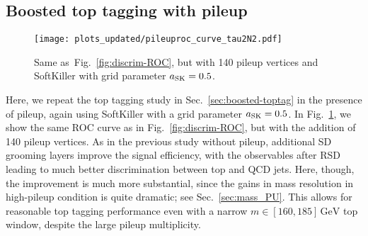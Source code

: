 \documentclass[11pt,a4paper]{article}
\newcommand{\GeV}{\,\mathrm{GeV}}
\DeclareRobustCommand{\Sec}[1]{Sec.~\ref{#1}}
\DeclareRobustCommand{\Fig}[1]{Fig.~\ref{#1}}
\begin{document}
\subsection{Boosted top tagging with pileup}
\label{sec:toptag-pileup}


\begin{figure}
  \centering
    \texttt{[image: plots\_updated/pileuproc\_curve\_tau2N2.pdf]}
    \caption{Same as~\Fig{fig:discrim-ROC}, but with 140 pileup
      vertices and SoftKiller with grid parameter $a_{\rm SK}=0.5$.}
  \label{fig:discrim-ROC-PU}
\end{figure}


Here, we repeat the top tagging study in \Sec{sec:boosted-toptag} in the presence of pileup, again using SoftKiller with a grid
parameter $a_{\rm SK}=0.5$.
%
In \Fig{fig:discrim-ROC-PU}, we show the same ROC curve as in \Fig{fig:discrim-ROC}, but with the addition of 140 pileup vertices.
%
As in the previous study without pileup, additional SD grooming layers improve the signal efficiency, with the observables
after RSD leading to much better discrimination between top and QCD jets.
%
Here, though, the improvement is much more substantial, since the gains in mass resolution in high-pileup condition is quite dramatic; see \Sec{sec:mass_PU}.
%
This allows for reasonable top tagging performance even with a narrow $m \in [160,185]\GeV$ top window, despite the large pileup multiplicity.





\end{document}
